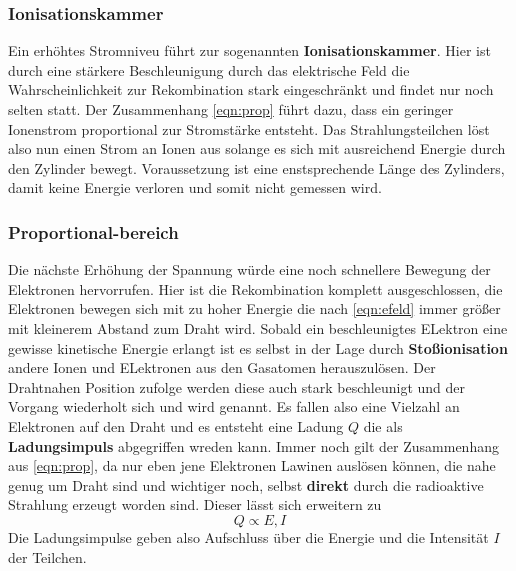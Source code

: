 \subsubsection{Ionisationskammer}
Ein erhöhtes Stromniveu führt zur sogenannten \textbf{Ionisationskammer}. Hier ist durch eine stärkere Beschleunigung durch das elektrische Feld die Wahrscheinlichkeit zur Rekombination stark eingeschränkt und findet nur noch selten statt. 
Der Zusammenhang \eqref{eqn:prop} führt dazu, dass ein geringer Ionenstrom proportional zur Stromstärke entsteht.
Das Strahlungsteilchen löst also nun einen Strom an Ionen aus solange es sich mit ausreichend Energie durch den Zylinder bewegt. Voraussetzung ist eine enstsprechende Länge des Zylinders, damit keine Energie verloren und somit nicht gemessen wird.
\subsubsection{Proportional-bereich}
\label{sub:porpotional}
Die nächste Erhöhung der Spannung würde eine noch schnellere Bewegung der Elektronen hervorrufen. Hier ist die Rekombination komplett ausgeschlossen, die Elektronen bewegen sich mit zu hoher Energie die nach \eqref{eqn:efeld} immer größer mit kleinerem Abstand zum Draht wird.
Sobald ein beschleunigtes ELektron eine gewisse kinetische Energie erlangt ist es selbst in der Lage durch \textbf{Stoßionisation} andere Ionen und ELektronen aus den Gasatomen herauszulösen. Der Drahtnahen Position zufolge werden diese auch stark beschleunigt und der Vorgang wiederholt sich
und wird  genannt. Es fallen also eine Vielzahl an Elektronen auf den Draht und es entsteht eine Ladung $Q$ die als \textbf{Ladungsimpuls} abgegriffen wreden kann. 
Immer noch gilt der Zusammenhang aus \eqref{eqn:prop}, da nur eben jene Elektronen Lawinen auslösen können, die nahe genug um Draht sind und wichtiger noch, selbst \textbf{direkt} durch die radioaktive Strahlung erzeugt worden sind. Dieser lässt sich erweitern zu
\begin{equation}
\label{eqn:prop2}
Q \propto E, I
\end{equation}
Die Ladungsimpulse geben also Aufschluss über die Energie und die Intensität $I$ der Teilchen. 
